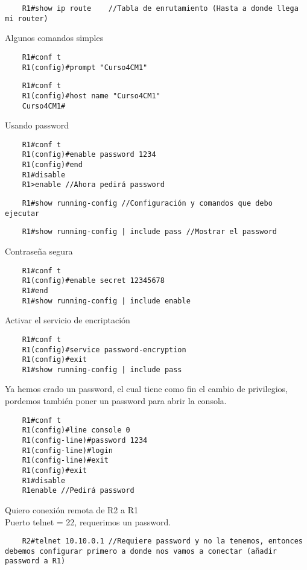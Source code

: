 \begin{lstlisting}
    R1#show ip route    //Tabla de enrutamiento (Hasta a donde llega mi router)
\end{lstlisting}

Algunos comandos simples
\begin{lstlisting}
    R1#conf t
    R1(config)#prompt "Curso4CM1"
\end{lstlisting}
\begin{lstlisting}
    R1#conf t 
    R1(config)#host name "Curso4CM1"
    Curso4CM1#
\end{lstlisting}
Usando password
\begin{lstlisting}
    R1#conf t
    R1(config)#enable password 1234
    R1(config)#end 
    R1#disable 
    R1>enable //Ahora pedirá password
\end{lstlisting}

\begin{lstlisting}
    R1#show running-config //Configuración y comandos que debo ejecutar
\end{lstlisting}

\begin{lstlisting}
    R1#show running-config | include pass //Mostrar el password
\end{lstlisting}

Contraseña segura
\begin{lstlisting}
    R1#conf t
    R1(config)#enable secret 12345678
    R1#end 
    R1#show running-config | include enable
\end{lstlisting}

Activar el servicio de encriptación
\begin{lstlisting}
    R1#conf t
    R1(config)#service password-encryption
    R1(config)#exit
    R1#show running-config | include pass
\end{lstlisting}

Ya hemos crado un password, el cual tiene como fin el cambio de privilegios, pordemos también poner un password para abrir la consola.
\begin{lstlisting}
    R1#conf t
    R1(config)#line console 0
    R1(config-line)#password 1234
    R1(config-line)#login 
    R1(config-line)#exit 
    R1(config)#exit
    R1#disable 
    R1enable //Pedirá password 
\end{lstlisting}

Quiero conexión remota de R2 a R1\\
Puerto telnet = 22, requerimos un password.
\begin{lstlisting}
    R2#telnet 10.10.0.1 //Requiere password y no la tenemos, entonces debemos configurar primero a donde nos vamos a conectar (añadir password a R1)
\end{lstlisting}

